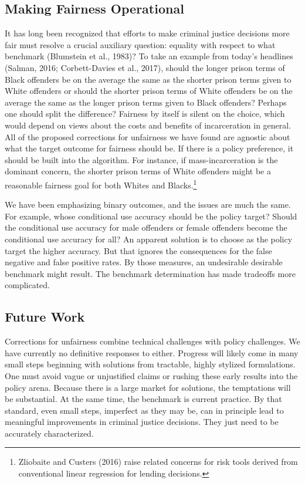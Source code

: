 \documentclass[12pt]{article}
\begin{document}
\subsection{Making Fairness Operational}

It has long been recognized that efforts to make criminal justice decisions more fair must resolve a crucial auxiliary question: equality with respect to what benchmark (Blumstein et al., 1983)? To take an example from today's headlines (Salman, 2016; Corbett-Davies et al., 2017), should the longer prison terms of Black offenders be on the average the same as the shorter prison terms given to White offenders or should the shorter prison terms of White offenders be on the average the same as the longer prison terms given to Black offenders? Perhaps one should split the difference? Fairness by itself is silent on the choice, which would depend on views about the costs and benefits of incarceration in general. All of the proposed corrections for unfairness we have found are agnostic about what the target outcome for fairness should be. If there is a policy preference, it should be built into the algorithm. For instance, if mass-incarceration is the dominant concern, the shorter prison terms of White offenders might be a reasonable fairness goal for both Whites and Blacks.\footnote
{ 
 Zliobaite and Custers (2016) raise related concerns for risk tools derived from conventional linear regression for lending decisions.
}

We have been emphasizing binary outcomes, and the issues are much the same. For example, whose conditional use accuracy should be the policy target? Should the conditional use accuracy for male offenders or female offenders become the conditional use accuracy for all? An apparent solution is to choose as the policy target the higher accuracy. But that ignores the consequences for the false negative and false positive rates. By those measures, an undesirable desirable benchmark might result. The benchmark determination has made tradeoffs more complicated. 

\subsection{Future Work}

Corrections for unfairness combine technical challenges with policy challenges. We have currently no definitive responses to either. Progress will likely come in many small steps beginning with solutions from tractable, highly stylized formulations. One must avoid vague or unjustified claims or rushing these early results into the policy arena. Because there is a large market for solutions, the temptations will be substantial. At the same time, the benchmark is current practice. By that standard, even small steps, imperfect as they may be, can in principle lead to meaningful improvements in criminal justice decisions. They just need to be accurately characterized.
\end{document}
